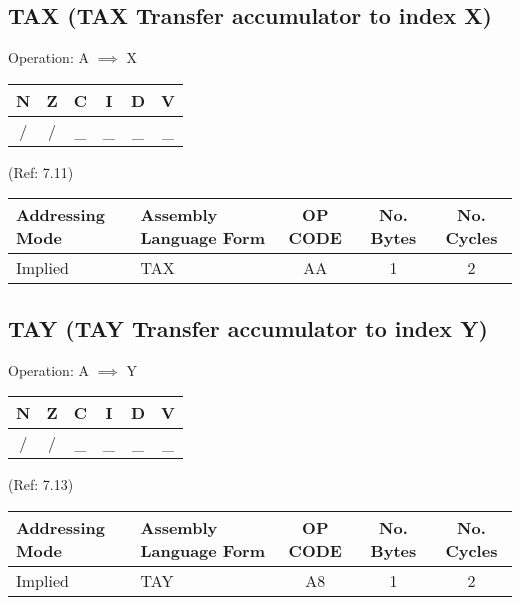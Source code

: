 \documentclass{article}
\begin{document}
  \subsection{TAX (TAX Transfer accumulator to index X)}
  Operation:  A $\implies$ X
  \begin{table}[H]
  \centering
  \begin{tabular}{|c c c c c c|}
  \hline
  N&Z&C&I&D&V\\
  \hline
  / & / & \_ & \_ & \_ & \_\\
  \hline
  \end{tabular}
  \end{table}
                                 (Ref: 7.11)
  \begin{table}[H]
  \centering
  \begin{tabular}{|l|l|c|c|c|}
  \hline
    Addressing Mode& Assembly Language Form& OP CODE &No. Bytes&No. Cycles\\
  \hline
     Implied       &   TAX                 &    AA   &    1    &    2     \\
  \hline
  \end{tabular}
  \end{table}


  \subsection{TAY (TAY Transfer accumulator to index Y)}
  Operation:  A $\implies$ Y
  \begin{table}[H]
  \centering
  \begin{tabular}{|c c c c c c|}
  \hline
  N&Z&C&I&D&V\\
  \hline
  / & / & \_ & \_ & \_ & \_\\
  \hline
  \end{tabular}
  \end{table}
                                 (Ref: 7.13)
  \begin{table}[H]
  \centering
  \begin{tabular}{|l|l|c|c|c|}
  \hline
    Addressing Mode& Assembly Language Form& OP CODE &No. Bytes&No. Cycles\\
  \hline
     Implied       &   TAY                 &    A8   &    1    &    2     \\
  \hline
  \end{tabular}
  \end{table}
\end{document}
